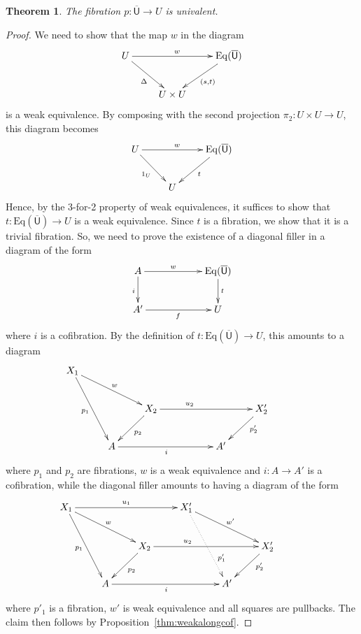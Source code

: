 \documentclass[reqno,10pt,a4paper,oneside]{amsart}
\newtheorem{theorem}{Theorem}[section]
\theoremstyle{definition}
\newcommand{\co}{\colon}
\newcommand{\UU}{\overline{\mathsf{U}}}
\newcommand{\Weq}{\mathrm{Eq}}
\begin{document}
\begin{theorem} The fibration  $p \co \UU \to U$ is univalent.
\end{theorem}

\begin{proof} We need to show that the map $w$ in the diagram
\[
\xymatrix{
U \ar[rr]^w \ar[dr]_{\Delta} & & \Weq(\UU) \ar[dl]^{(s,t)} \\
 & U \times U }
 \]
 is a weak equivalence.  By composing with the second projection $\pi_2 \co U \times U \to U$, this diagram
 becomes 
 \[
\xymatrix{
U \ar[rr]^w \ar[dr]_{1_U} & & \Weq(\UU) \ar[dl]^{t} \\
 & U  }
 \]
 Hence, by the 3-for-2 property of weak equivalences, it suffices to show that $t \co \Weq(\UU) \to U$ is
 a weak equivalence. Since $t$ is a fibration, we show that it is a trivial fibration. So, we need to prove
 the existence of a diagonal filler in a diagram of the form
 \begin{equation*}
 \xymatrix@C=2cm{
 A \ar[d]_i \ar[r]^-{w}  & \Weq(\UU) \ar[d]^t \\
 A' \ar[r]_{f} & U }
 \end{equation*}
where $i$ is a cofibration. By the definition of $t \co \Weq(\UU) \to U$, this amounts to a diagram
 \[
 \xymatrix{
 X_1 \ar[ddr]_{p_1}  \ar[drr]^{w}  &  & &  & & \\
  & & X_2 \ar[dl]^{p_2} \ar[rrr]^(.35){u_2} & & &  X_2' \ar[dl]^(.35){p'_2} \\
  & A \ar[rrr]_{i}  & & &A' & & }
  \]
  where $p_1$ and $p_2$ are fibrations, $w$ is a weak equivalence and $i \co A \to A'$ is a cofibration,  
  while the diagonal filler amounts to having a diagram of the form
 \[
 \xymatrix{
 X_1 \ar[ddr]_{p_1}  \ar[drr]^{w} \ar[rrr]^{u_1} &  & & X_1' \ar[drr]^{w'}  \ar@{.>}[ddr]^(.7){p_1'}  & & \\
  & & X_2 \ar[dl]^{p_2} \ar[rrr]^(.35){u_2} & & &  X_2' \ar[dl]^(.35){p'_2} \\
  & A \ar[rrr]_{i}  & & &A' & & }
  \]
where $p'_1$ is a fibration, $w'$ is weak equivalence and all squares are pullbacks. The claim then
follows by Proposition~\ref{thm:weakalongcof}.
 \end{proof} 
\end{document}
